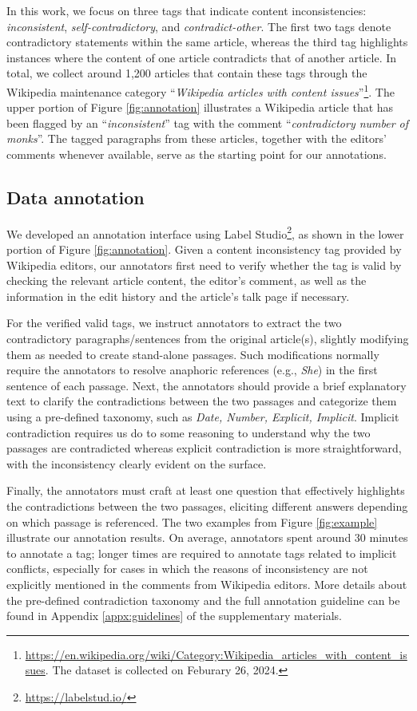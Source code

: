 \documentclass{article}
\begin{document}
In this work, we focus on three tags that indicate content inconsistencies: \emph{inconsistent}, \emph{self-contradictory}, and \emph{contradict-other}. The first two tags denote contradictory statements within the same article, whereas the third tag highlights instances where the content of one article contradicts that of another article. In total, we collect around 1,200 articles that contain these tags through the Wikipedia maintenance category ``\emph{Wikipedia articles with content issues}''\footnote{\url{https://en.wikipedia.org/wiki/Category:Wikipedia_articles_with_content_issues}. The dataset is collected on Feburary 26, 2024.}. The upper portion of Figure \ref{fig:annotation} illustrates a Wikipedia article that has been flagged by an ``\emph{inconsistent}'' tag with the comment ``\emph{contradictory number of monks}''. The tagged paragraphs from these articles, together with the editors' comments whenever available, serve as the starting point for our annotations.

\subsection{Data annotation}
We developed an annotation interface using Label Studio\footnote{\url{https://labelstud.io/}}, as shown in the lower portion of Figure \ref{fig:annotation}. Given a content inconsistency tag provided by Wikipedia editors, our annotators first need to verify whether the tag is valid by checking the relevant article content, the editor's comment, as well as the information in the edit history and the article's talk page if necessary.   

For the verified valid tags, we instruct annotators to extract the two contradictory paragraphs/sentences from the original article(s), slightly modifying them as needed to create stand-alone passages. Such modifications normally require the annotators to resolve anaphoric references (e.g., \emph{She}) in the first sentence of each passage. Next, the annotators should provide a brief explanatory text to clarify the contradictions between the two passages and categorize them using a pre-defined taxonomy, such as \emph{Date, Number, Explicit, Implicit}. Implicit contradiction requires us do to some reasoning to understand why the two passages are contradicted 
whereas explicit contradiction is more straightforward, with the inconsistency clearly evident on the surface.


Finally, the annotators must craft at least one question that effectively highlights the contradictions between the two passages, eliciting different answers depending on which passage is referenced. The two examples from Figure \ref{fig:example} illustrate our annotation results. On average, annotators spent around 30 minutes to annotate a tag; longer times are required to annotate tags related to implicit conflicts, especially for cases in which the reasons of inconsistency are not explicitly mentioned in the comments from Wikipedia editors.  More details about the pre-defined contradiction taxonomy and the full annotation guideline can be found in Appendix \ref{appx:guidelines} of the supplementary materials.
\end{document}
